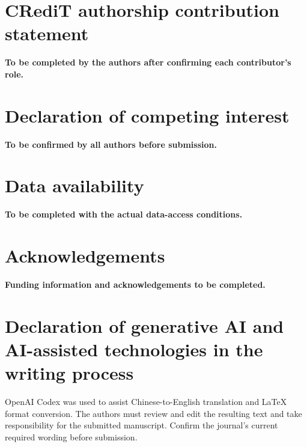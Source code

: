 \documentclass[preprint,12pt]{elsarticle}
\begin{document}
\section*{CRediT authorship contribution statement}
\textbf{To be completed by the authors after confirming each contributor's role.}
\section*{Declaration of competing interest}
\textbf{To be confirmed by all authors before submission.}
\section*{Data availability}
\textbf{To be completed with the actual data-access conditions.}
\section*{Acknowledgements}
\textbf{Funding information and acknowledgements to be completed.}
\section*{Declaration of generative AI and AI-assisted technologies in the writing process}
OpenAI Codex was used to assist Chinese-to-English translation and LaTeX format conversion. The authors must review and edit the resulting text and take responsibility for the submitted manuscript. Confirm the journal's current required wording before submission.



\end{document}
